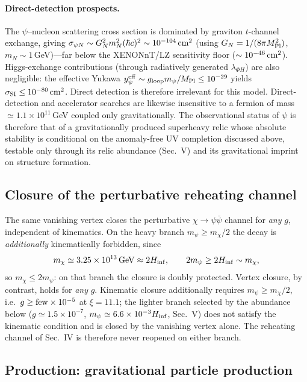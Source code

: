 \documentclass[pdflatex,sn-mathphys-num]{sn-jnl}
\providecommand{\gtrsim}{\geq}
\newcommand{\MP}{M_{\rm Pl}}
\theoremstyle{thmstyleone}
\begin{document}
\paragraph{Direct-detection prospects.} The $\psi$--nucleon scattering cross section is dominated by graviton $t$-channel exchange, giving $\sigma_{\psi N}\sim G_N^2 m_N^2(\hbar c)^2\sim10^{-104}\,{\rm cm}^2$ (using $G_N=1/(8\pi\MP^2)$, $m_N\sim1\,$GeV)---far below the XENONnT/LZ sensitivity floor ($\sim10^{-46}\,{\rm cm}^2$). Higgs-exchange contributions (through radiatively generated $\lambda_{\Phi H}$) are also negligible: the effective Yukawa $y_{\psi}^{\rm eff}\sim g_{\rm loop}m_\psi/\MP\leq10^{-29}$ yields $\sigma_{\rm SI}\leq10^{-80}\,{\rm cm}^2$. Direct detection is therefore irrelevant for this model. Direct-detection and accelerator searches are likewise insensitive to a fermion of mass $\simeq1.1\times10^{11}\,$GeV coupled only gravitationally. The observational status of $\psi$ is therefore that of a gravitationally produced superheavy relic whose absolute stability is conditional on the anomaly-free UV completion discussed above, testable only through its relic abundance (Sec.~V) and its gravitational imprint on structure formation.

\subsection{Closure of the perturbative reheating channel}

The same vanishing vertex closes the perturbative $\chi\to\psi\bar\psi$ channel for \emph{any} $g$, independent of kinematics. On the heavy branch $m_\psi\gtrsim m_\chi/2$ the decay is \emph{additionally} kinematically forbidden, since
\begin{equation}
m_\chi\simeq3.25\times10^{13}\,{\rm GeV}\approx2H_{\rm inf},
\qquad
2m_\psi\geq2H_{\rm inf}\sim m_\chi,
\label{eq:kinematic}
\end{equation}
so $m_\chi\leq2m_\psi$: on that branch the closure is doubly protected. Vertex closure, by contrast, holds for \emph{any} $g$. Kinematic closure additionally requires $m_\psi\geq m_\chi/2$, i.e.\ $g\gtrsim{\rm few}\times10^{-5}$ at $\xi=11.1$; the lighter branch selected by the abundance below ($g\simeq1.5\times10^{-7}$, $m_\psi\simeq6.6\times10^{-3}H_{\rm inf}$, Sec.~V) does not satisfy the kinematic condition and is closed by the vanishing vertex alone. The reheating channel of Sec.~IV is therefore never reopened on either branch.

\subsection{Production: gravitational particle production}
\end{document}
